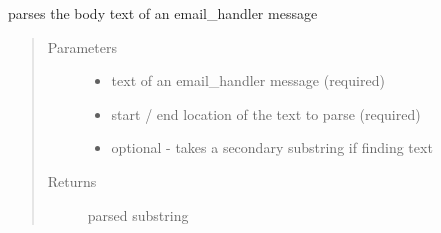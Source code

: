 \documentclass[letterpaper,10pt,english]{sphinxmanual}
\begin{document}

\begin{fulllineitems}
\label{\detokenize{index:ListManagement.utility.email_helper.email_parser}}
parses the body text of an email\_handler message
\begin{quote}\begin{description}
\item[{Parameters}] \leavevmode\begin{itemize}
\item {} 
 \textendash{} text of an email\_handler message (required)

\item {} 
 \textendash{} start / end location of the text to parse (required)

\item {} 
 \textendash{} optional - takes a secondary substring if finding text

\end{itemize}

\item[{Returns}] \leavevmode
parsed substring

\end{description}\end{quote}

\end{fulllineitems}


\begin{fulllineitems}
\label{\detokenize{index:ListManagement.utility.email_helper.get_decoded_email_body}}
\end{fulllineitems}

\end{document}
